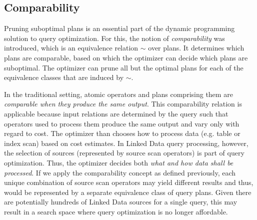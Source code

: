 \subsection{Comparability}
\label{sec:comparability}

Pruning suboptimal plans is an essential part of the dynamic programming solution to
query optimization. 
For this, the notion of \emph{comparability} was introduced, which is an equivalence relation $\sim$ over plans. It determines which plans are comparable, based on which  
the optimizer can decide which plans are suboptimal. The optimizer can prune all but the optimal plans for each of the equivalence classes that are induced by $\sim$. 

In the traditional setting, atomic operators and plans comprising them are \emph{comparable when they produce the same output}. This comparability relation is applicable because input relations are determined by the query such that operators used to process them produce the same output and vary only with regard to cost. The optimizer than chooses how to process data (e.g. table or index
scan) based on cost estimates. In Linked Data query processing, however, the selection of
sources (represented by source scan operators) is part of query
optimization. Thus, the optimizer decides both \emph{what and how data shall be processed}. 
If we apply the comparability concept as defined
previously, each unique combination of source scan operators may yield different results and thus, would be represented by a separate equivalence class of query plans. Given there
are potentially hundreds of Linked Data sources for a single query, this may result in a search space where query optimization is no longer affordable.

